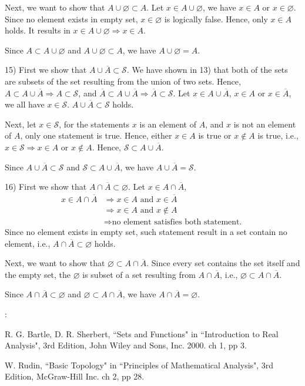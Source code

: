 \documentclass[12pt,thmsa]{article}
\begin{document}
Next, we want to show that \( A \cup \varnothing \subset A \). Let \( x \in A \cup \varnothing\), we have \( x \in A\) or \( x \in \varnothing\). Since no element exists in empty set, \( x \in \varnothing\) is logically false. Hence, only \( x \in A\) holds. It results in \( x \in A \cup \varnothing \Rightarrow x \in A\).

Since \(A \subset A \cup \varnothing\) and \( A \cup \varnothing \subset A \), we have \( A \cup  \varnothing = A \).

\medskip

15)
First we show that \(A \cup \overline{A} \subset \mathcal{S}\). We have shown in 13) that both of the sets are subsets of the set resulting from the union of two sets. Hence, \(A \subset A \cup \overline{A} \Rightarrow A \subset \mathcal{S}\), and \(\overline{A} \subset A \cup \overline{A} \Rightarrow \overline{A} \subset \mathcal{S}\). Let \(x \in A \cup \overline{A} \), \(x \in A\) or \( x \in \overline{A} \), we all have \(x \in \mathcal{S}\). \(A \cup \overline{A} \subset \mathcal{S}\) holds.

Next, let \(x \in \mathcal{S}\), for the statements \(x\) is an element of \(A\), and \(x\) is not an element of \(A\), only one statement is true. Hence, either \(x \in A\) is true or \(x \notin A\) is true, i.e., 
\(x \in \mathcal{S} \Rightarrow x \in A  \text{ or } x \notin A\). Hence, \(\mathcal{S} \subset A \cup \overline{A} \).

Since \(A \cup \overline{A} \subset \mathcal{S}\) and \(\mathcal{S} \subset A \cup \overline{A} \), we have \( A \cup \overline{A} = \mathcal{S} \).

\medskip

16)
First we show that \(A \cap  \overline{A} \subset \varnothing\). Let \(x \in A \cap  \overline{A}\),
\[\begin{aligned}
x \in A \cap  \overline{A} & \Rightarrow x \in A \text{ and } x \in  \overline{A} \\
& \Rightarrow x \in A \text{ and } x \notin A \\
& \Rightarrow \text{no element satisfies both statement. }
\end{aligned}\]
Since no element exists in empty set, such statement result in a set contain no element, i.e., \(A \cap  \overline{A} \subset \varnothing\) holds.

Next, we want to show that \( \varnothing \subset A \cap  \overline{A} \). Since every set contains the set itself and the empty set, the \( \varnothing \) is subset of a set resulting from \(A \cap  \overline{A} \), i.e., \( \varnothing \subset A \cap  \overline{A} \).

Since \(A \cap  \overline{A} \subset \varnothing\) and \( \varnothing \subset A \cap \overline{A} \), we have \( A \cap  \overline{A} = \varnothing \).
\bigskip

\noindent
[Ref]: 

R. G. Bartle, D. R. Sherbert, ``Sets and Functions" in ``Introduction to Real Analysis", 3rd Edition, John Wiley and Sons, Inc. 2000. ch 1, pp 3.

W. Rudin, ``Basic Topology" in ``Principles of Mathematical Analysis", 3rd Edition, McGraw-Hill Inc. ch 2, pp 28.
\end{document}
